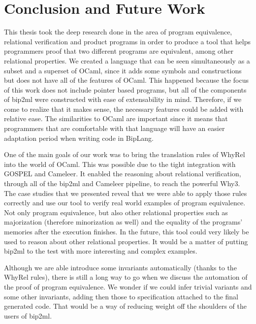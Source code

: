 
%

\chapter{Conclusion and Future Work}
\label{cha:conclusion}

This thesis took the deep research done in the area of program equivalence, relational verification and product programs in order to produce a tool that helps programmers proof that two different programs are equivalent, among other relational properties.
We created a language that can be seen simultaneously as a subset and a superset of OCaml, since it adds some symbols and constructions but does not have all of the features of OCaml.
This happened because the focus of this work does not include pointer based programs, but all of the components of bip2ml were constructed with ease of extensability in mind. 
Therefore, if we come to realize that it makes sense, the necessary features could be added with relative ease.
The similarities to OCaml are important since it means that programmers that are comfortable with that language will have an easier adaptation period when writing code in BipLang.

One of the main goals of our work was to bring the translation rules of WhyRel into the world of OCaml.
This was possible due to the tight integration with GOSPEL and Cameleer.
It enabled the reasoning about relational verification, through all of the bip2ml and Cameleer pipeline, to reach the powerful Why3. 
The case studies that we presented reveal that we were able to apply those rules correctly and use our tool to verify real world examples of program equivalence.
Not only program equivalence, but also other relational properties such as majorization (therefore minorization as well) and the equality of the programs' memories after the execution finishes.
In the future, this tool could very likely be used to reason about other relational properties.
It would be a matter of putting bip2ml to the test with more interesting and complex examples.

Although we are able introduce some invariants automatically (thanks to the WhyRel rules), there is still a long way to go when we discuss the automation of the proof of program equivalence.
We wonder if we could infer trivial variants and some other invariants, adding then those to specification attached to the final generated code.
That would be a way of reducing weight off the shoulders of the users of bip2ml.










